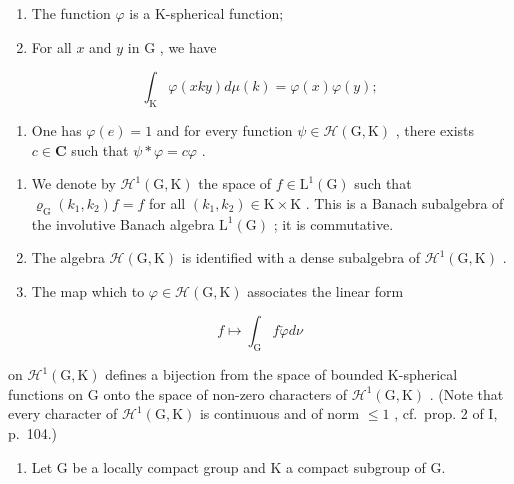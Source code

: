 \begin{enumerate}
\def\labelenumi{(\roman{enumi})}
\item
  The function \(\varphi\) is a K-spherical function;
\item
  For all \(x\) and \(y\) in \(\mathrm{G}\) , we have
\end{enumerate}

\[
\int_ {\mathrm{K}} \varphi (x k y) d \mu (k) = \varphi (x) \varphi (y);
\]

\begin{enumerate}
\def\labelenumi{(\roman{enumi})}
\setcounter{enumi}{2}
\tightlist
\item
  One has \(\varphi(e)=1\) and for every function \(\psi\in\mathcal{H}(\mathrm{G},\mathrm{K})\) , there exists \(c\in\mathbf{C}\) such that \(\psi*\varphi=c\varphi\) .
\end{enumerate}

\begin{enumerate}
\def\labelenumi{\alph{enumi})}
\setcounter{enumi}{1}
\item
  We denote by \(\mathcal{H}^1 (\mathrm{G},\mathrm{K})\) the space of \(f\in \mathrm{L}^1 (\mathrm{G})\) such that \(\varrho_{\mathrm{G}}(k_1,k_2)f = f\) for all \((k_{1},k_{2})\in \mathrm{K}\times \mathrm{K}\) . This is a Banach subalgebra of the involutive Banach algebra \(\mathrm{L}^1 (\mathrm{G})\) ; it is commutative.
\item
  The algebra \(\mathcal{H}(\mathrm{G},\mathrm{K})\) is identified with a dense subalgebra of \(\mathcal{H}^1 (\mathrm{G},\mathrm{K})\) .\\
\item
  The map which to \(\varphi \in \mathcal{H}(\mathrm{G},\mathrm{K})\) associates the linear form
\end{enumerate}

\[
f \mapsto \int_ {\mathrm{G}} f \check {\varphi} d \nu
\]

on \(\mathcal{H}^{1}(\mathrm{G},\mathrm{K})\) defines a bijection from the space of bounded K-spherical functions on G onto the space of non-zero characters of \(\mathcal{H}^{1}(\mathrm{G},\mathrm{K})\) . (Note that every character of \(\mathcal{H}^{1}(\mathrm{G},\mathrm{K})\) is continuous and of norm \(\leqslant 1\) , cf.~prop. 2 of I, p.~104.)

\begin{enumerate}
\def\labelenumi{\arabic{enumi})}
\setcounter{enumi}{27}
\tightlist
\item
  Let G be a locally compact group and K a compact subgroup of G.
\end{enumerate}

